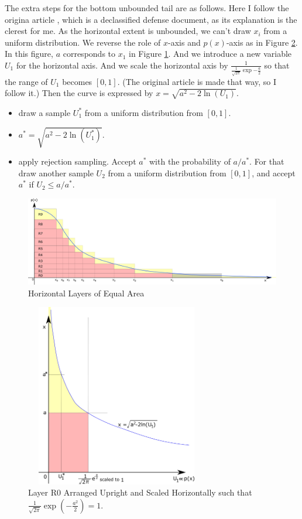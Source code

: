 \documentclass[a4]{article}
\begin{document}
The extra steps for the bottom unbounded tail are as follows.
Here I follow the origina article  \cite{ziggurat_1963}, which is a declassified defense document,
as its explanation is the clerest for me.
As the horizontal extent is unbounded, we can't draw $x_i$ from a uniform distribution.
We reverse the role of $x$-axis and $p(x)$-axis as in Figure \ref{fig:ziggrat_R0}.
In this figure, $a$ corresponds to $x_1$ in Figure \ref{fig:ziggrat_layers}.
And we introduce a new variable $U_1$ for the horizontal axis.
And we scale the horizontal axis by $\frac{1}{\frac{1}{\sqrt{2\pi}}\exp{-\frac{a}{2}}}$ so that
the range of $U_1$ becomes $[0,1]$. (The original article \cite{ziggurat_1963} is made that way, so I follow it.)
Then the curve is expressed by $x = \sqrt{a^2 - 2\ln(U_1)}$.

\begin{itemize}
\item draw a sample $U_1^*$ from a uniform distribution from $[0,1]$.
\item $a^* = \sqrt{a^2 - 2\ln(U_1^*)}$.
\item apply rejection sampling. Accept $a^*$ with the probability of $a/a^*$. For that draw another
sample $U_2$ from a uniform distribution from $[0,1]$, and accept $a^*$ if $U_2 \le a/a^*$.
\end{itemize}


\begin{figure}
\centering
\includegraphics[width=14cm]{ziggurat_layers.png}
\caption{Horizontal Layers of Equal Area}
\label{fig:ziggrat_layers}
\end{figure}

\begin{figure}
\centering
\includegraphics[height=8cm, width=8cm]{ziggurat_R0.png}
\caption{Layer R0 Arranged Upright and Scaled Horizontally such that $\frac{1}{\sqrt{2\pi}}
\exp(-\frac{a^2}{2}) = 1$.}
\label{fig:ziggrat_R0}
\end{figure}
\end{document}
